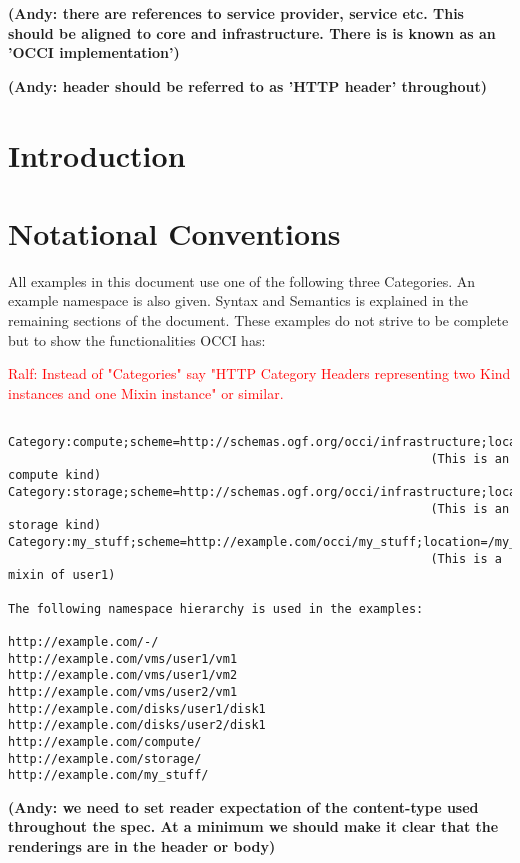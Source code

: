 \documentclass[10pt,a4paper]{article}
\newcommand{\ralf}[1]{\textcolor{red}{Ralf: #1}}
\begin{document}
\textbf{(Andy: there are references to service provider, service etc. This should be aligned to core and infrastructure. There is is known as an 'OCCI implementation')}

\textbf{(Andy: header should be referred to as 'HTTP header' throughout)}

\newpage
\tableofcontents
\newpage

\section{Introduction}


\section{Notational Conventions}


All examples in this document use one of the following three
Categories. An example namespace is also given. Syntax and Semantics
is explained in the remaining sections of the document. These examples
do not strive to be complete but to show the functionalities OCCI has:

\ralf{Instead of "Categories" say "HTTP Category Headers representing two Kind
instances and one Mixin instance" or similar.}

\begin{verbatim}

Category:compute;scheme=http://schemas.ogf.org/occi/infrastructure;location=/compute 
                                                           (This is an compute kind)
Category:storage;scheme=http://schemas.ogf.org/occi/infrastructure;location=/storage 
                                                           (This is an storage kind)
Category:my_stuff;scheme=http://example.com/occi/my_stuff;location=/my_stuff 
                                                           (This is a mixin of user1)

The following namespace hierarchy is used in the examples:

http://example.com/-/
http://example.com/vms/user1/vm1
http://example.com/vms/user1/vm2
http://example.com/vms/user2/vm1
http://example.com/disks/user1/disk1
http://example.com/disks/user2/disk1
http://example.com/compute/
http://example.com/storage/
http://example.com/my_stuff/
\end{verbatim}

\textbf{(Andy: we need to set reader expectation of the content-type used 
throughout the spec. At a minimum we should make it clear that the 
renderings are in the header or body)}
\end{document}

